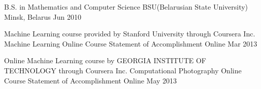 

\begin{cveducations}

  \cveducation
    {B.S. in Mathematics and Computer Science} %
    {BSU(Belarusian State University)} %
    {Minsk, Belarus} %
    {Jun 2010} %
    {
      \begin{cvitems} %
      \end{cvitems}
    }

  \cveducation
    {Machine Learning course provided by Stanford University through Coursera Inc.} %
    {Machine Learning Online Course Statement of Accomplishment} %
    {Online} %
    {Mar 2013} %
    {
      \begin{cvitems} %
      \end{cvitems}
    }

  \cveducation
    {Online Machine Learning course by GEORGIA INSTITUTE OF TECHNOLOGY through Coursera Inc.} %
    {Computational Photography Online Course Statement of Accomplishment } %
    {Online} %
    {May 2013} %
    {
      \begin{cvitems} %
      \end{cvitems}
    }

\end{cveducations}
